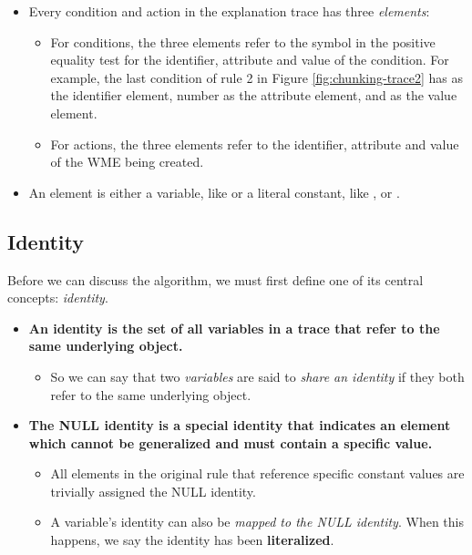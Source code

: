\begin{itemize}
	\item Every condition and action in the explanation trace has three \textit{elements}:
	
	\begin{itemize}
		\item For conditions, the three elements refer to the symbol in the positive equality test for the identifier, attribute and value of the condition.  For example, the last condition of rule 2 in Figure \ref{fig:chunking-trace2} has  as the identifier element, number as the attribute element, and  as the value element.
		
		\item For actions, the three elements refer to the identifier, attribute and value of the WME being created.
	\end{itemize}
	
	\item An element is either a variable, like    or a literal constant, like  ,    or   .
	
\end{itemize}

\subsection{Identity}

Before we can discuss the algorithm, we must first define one of its central concepts: \textit{identity}.  

\begin{itemize}
	\item \textbf{An identity is the set of all variables in a trace that refer to the same underlying object.}
	\begin{itemize}
		\item So we can say that two \textit{variables} are said to \textit{share an identity} if they both refer to the same underlying object.
	\end{itemize}
	\item \textbf{The NULL identity is a special identity that indicates an element which cannot be generalized and must contain a specific value.}
	\begin{itemize}
		\item All elements in the original rule that reference specific constant values are trivially assigned the NULL identity.
		\item A variable's identity can also be \textit{mapped to the NULL identity}.  When this happens, we say the identity has been \textbf{literalized}.
	\end{itemize}
\end{itemize}

